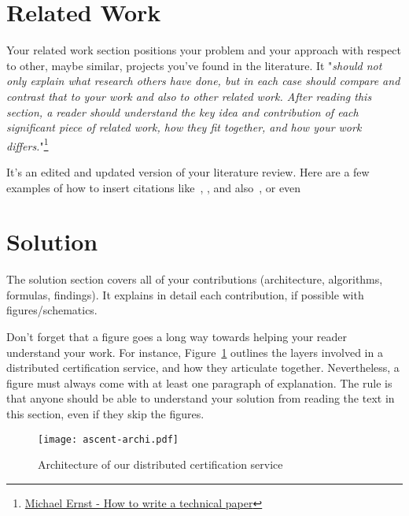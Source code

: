 \documentclass{scrartcl}
\begin{document}
\section{Related Work}

Your related work section positions your problem and your approach with respect to other, maybe similar, projects you've found in the literature. 
It "\textit{should not only explain what research others have done, but in each case should compare and contrast that to your work and also to other related work. After reading this section, a reader should understand the key idea and contribution of each significant piece of related work, how they fit together, and how your work differs.}"\footnote{\href{https://homes.cs.washington.edu/~mernst/advice/write-technical-paper.html\#related-work}{Michael Ernst - How to write a technical paper}} 

It's an edited and updated version of your literature review. Here are a few examples of how to insert citations like~\cite{Groth2016}, \cite{Roy2024}, and also~\cite{goldreich1991proofs}, or even~\cite{arun2024jolt}

\section{Solution}

The solution section covers all of your contributions (architecture, algorithms, formulas, findings).
It explains in detail each contribution, if possible with figures/schematics.

Don't forget that a figure goes a long way towards helping your reader understand your work. For instance, Figure~\ref{fig:ascent} outlines the layers involved in a distributed certification service, and how they articulate together. Nevertheless, a figure must always come with at least one paragraph of explanation. The rule is that anyone should be able to understand your solution from reading the text in this section, even if they skip the figures.

\begin{figure}[H]
	\begin{center}
		\texttt{[image: ascent-archi.pdf]}
	\end{center}
	\caption{Architecture of our distributed certification service}
	\label{fig:ascent}
\end{figure}
\end{document}
